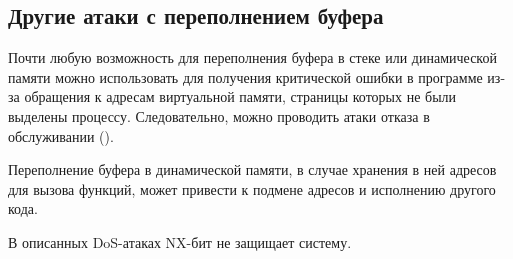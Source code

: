 \subsection{Другие атаки с переполнением буфера}

Почти любую возможность для переполнения буфера в стеке или динамической памяти можно использовать для получения критической ошибки в программе из-за обращения к адресам виртуальной памяти, страницы которых не были выделены процессу. Следовательно, можно проводить атаки отказа в обслуживании ().

Переполнение буфера в динамической памяти, в случае хранения в ней адресов для вызова функций, может привести к подмене адресов и исполнению другого кода.

В описанных DoS-атаках NX-бит не защищает систему.
